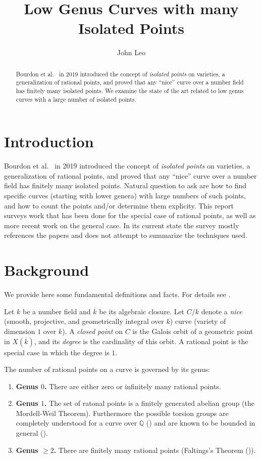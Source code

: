 \documentclass[12pt, reqno]{amsart}
\title{Low Genus Curves with many Isolated Points}
\author{John Leo}
\newcommand{\Q}{{\mathbb Q}}
\newcommand{\kbar}{{\overline{k}}}
\numberwithin{equation}{section}
\numberwithin{table}{section}
\begin{document}
\begin{abstract}
Bourdon et al.\ \cite{Bourdon2019} in 2019 introduced the concept of
\textit{isolated points} on varieties, a generalization of rational
points, and proved that any ``nice'' curve over a number field has
finitely many isolated points. We examine the state of the art related
to low genus curves with a large number of isolated points.
\end{abstract}

\maketitle

\section{Introduction}

Bourdon et al.\ \cite{Bourdon2019} in 2019 introduced the concept of
\textit{isolated points} on varieties, a generalization of rational
points, and proved that any ``nice'' curve over a number field has
finitely many isolated points. Natural question to ask are how to find
specific curves (starting with lower genera) with large numbers of
such points, and how to count the points and/or determine them
explicity. This report surveys work that has been done for the special
case of rational points, as well as more recent work on the general
case. In its current state the survey mostly references the papers and
does not attempt to summarize the techniques used.

\section{Background}

We provide here some fundamental definitions and facts. For details
see \cite{Viray2024}.

Let $k$ be a number field and $\kbar$ be its
algebraic closure. Let $C/k$ denote a \textit{nice} (smooth,
projective, and geometrically integral over $k$) curve (variety of
dimension $1$ over $k$). A \textit{closed point} on $C$ is the Galois
orbit of a geometric point in $X(\kbar)$, and its \textit{degree} is
the cardinality of this orbit. A rational point is the special case in
which the degree is $1$.

The number of rational points on a curve is governed by its genus:
\begin{enumerate}
  \item \textbf{Genus $0$.} There are either zero or infinitely many
    rational points.
  \item \textbf{Genus $1$.} The set of ratonal points is a finitely
    generated abelian group (the Mordell-Weil Theorem). Furthermore the possible
    torsion groups are completely understood for a curve over $\Q$
    (\cites{Mazur1977, Mazur1978}) and are known to be bounded in
    general (\cite{Merel1996}).
  \item \textbf{Genus $\ge 2$.} There are finitely many rational points
    (Faltings's Theorem (\cite{Faltings1983})).
\end{enumerate}
\end{document}
